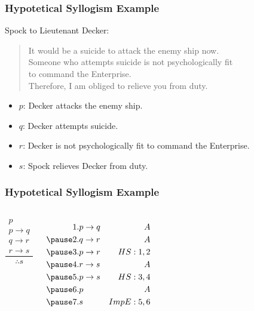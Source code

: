 \documentclass[dvipsnames]{beamer}
\begin{document}
\begin{frame}
  \frametitle{Hypotetical Syllogism Example}

  Spock to Lieutenant Decker:
  \begin{quote}
    It would be a suicide to attack the enemy ship now.\\
    Someone who attempts suicide is not psychologically fit\\
    to command the Enterprise.\\
    Therefore, I am obliged to relieve you from duty.
  \end{quote}

  \pause
  \begin{itemize}
    \item $p$: Decker attacks the enemy ship.
    \item $q$: Decker attempts suicide.
    \item $r$: Decker is not psychologically fit to command the Enterprise.
    \item $s$: Spock relieves Decker from duty.
  \end{itemize}
\end{frame}

\begin{frame}
  \frametitle{Hypotetical Syllogism Example}

  \begin{columns}
    \[
    \frac
      {
        \begin{array}{c}
          p\\
          p \rightarrow q\\
          q \rightarrow r\\
          r \rightarrow s
        \end{array}
      }
      {
        \therefore s
      }
    \]

    \pause
    \begin{eqnarray*}
      1. & p \rightarrow q & A\\
      \pause
      2. & q \rightarrow r & A\\
      \pause
      3. & p \rightarrow r & HS:1,2\\
      \pause
      4. & r \rightarrow s & A\\
      \pause
      5. & p \rightarrow s & HS:3,4\\
      \pause
      6. & p               & A\\
      \pause
      7. & s               & ImpE:5,6
    \end{eqnarray*}
  \end{columns}
\end{frame}
\end{document}
